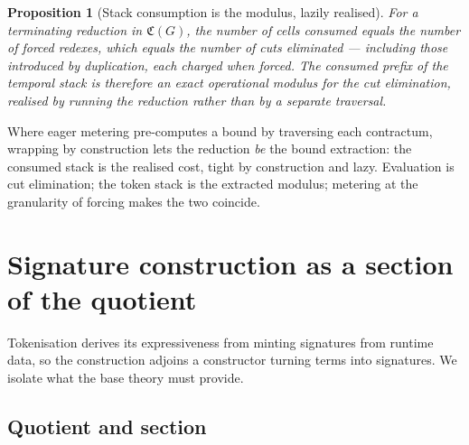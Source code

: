 \documentclass[11pt]{article}
\theoremstyle{definition}
\theoremstyle{plain}
\newtheorem{proposition}[definition]{Proposition}
\newcommand{\Cost}{\mathfrak{C}}              %
\begin{document}
\begin{proposition}[Stack consumption is the modulus, lazily realised]
\label{prop:modulus}
For a terminating reduction in $\Cost(G)$, the number of cells consumed
equals the number of forced redexes, which equals the number of cuts
eliminated --- including those introduced by duplication, each charged
when forced. The consumed prefix of the temporal stack is therefore an
exact operational modulus for the cut elimination, realised by running
the reduction rather than by a separate traversal.
\end{proposition}

Where eager metering pre-computes a bound by traversing each contractum,
wrapping by construction lets the reduction \emph{be} the bound
extraction: the consumed stack is the realised cost, tight by
construction and lazy. Evaluation is cut elimination; the token stack is
the extracted modulus; metering at the granularity of forcing makes the
two coincide.

\section{Signature construction as a section of the quotient}
\label{sec:signatures}

Tokenisation derives its expressiveness from minting signatures from
runtime data, so the construction adjoins a constructor turning terms
into signatures. We isolate what the base theory must provide.

\subsection{Quotient and section}
\end{document}
